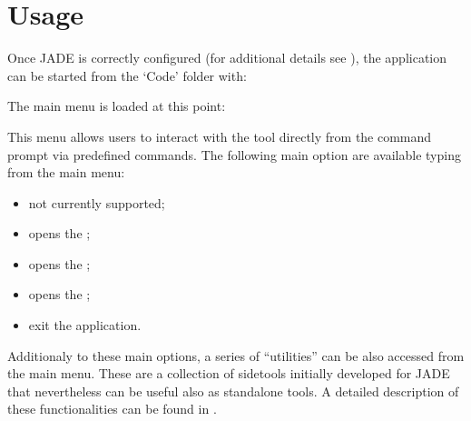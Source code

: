 \documentclass[letterpaper,10pt,english]{sphinxmanual}
\let\sphinxpxdimen\pdfpxdimen\else\newdimen\sphinxpxdimen
\begin{document}
\chapter{Usage}
\label{\detokenize{usage/menu:usage}}\label{\detokenize{usage/menu:menu}}\label{\detokenize{usage/menu::doc}}
\sphinxAtStartPar
Once JADE is correctly configured
(for additional details see {\hyperref[\detokenize{usage/configuration:config}]{}}), the application can be started
from the ‘Code’ folder with:

\sphinxAtStartPar
{}

\sphinxAtStartPar
The main menu is loaded at this point:

\noindent\sphinxincludegraphics[width=400\sphinxpxdimen]{{main_menu}.png}

\sphinxAtStartPar
This menu allows users to interact with the tool directly from the
command prompt via pre\sphinxhyphen{}defined commands.
The following main option are available typing from the main menu:
\begin{itemize}
\item {} 
\sphinxAtStartPar
{} not currently supported;

\item {} 
\sphinxAtStartPar
{} opens the {\hyperref[\detokenize{usage/menu:compmenu}]{}};

\item {} 
\sphinxAtStartPar
{} opens the {\hyperref[\detokenize{usage/menu:expmenu}]{}};

\item {} 
\sphinxAtStartPar
{} opens the {\hyperref[\detokenize{usage/menu:postmenu}]{}};

\item {} 
\sphinxAtStartPar
{} exit the application.

\end{itemize}

\sphinxAtStartPar
Additionaly to these main options, a series of “utilities” can be also accessed
from the main menu. These are a collection of side\sphinxhyphen{}tools initially developed
for JADE that nevertheless can be useful also as stand\sphinxhyphen{}alone tools.
A detailed description of these functionalities can be found in {\hyperref[\detokenize{usage/utilities:uty}]{}}.
\end{document}
